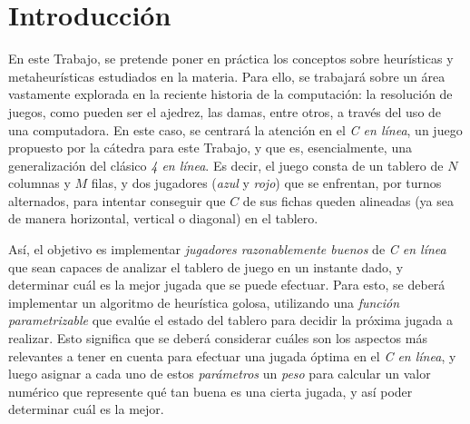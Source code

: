 \documentclass[12pt,a4paper]{article}
\begin{document}





\maketitle

\thispagestyle{empty}
\tableofcontents
\clearpage
\setcounter{page}{1}

\pagestyle{fancy}
\fancyhf{}
\rfoot{\centering \thepage}



\section{Introducción}


En este Trabajo, se pretende poner en práctica los conceptos sobre heurísticas y metaheurísticas estudiados en la materia. Para ello, se trabajará sobre un área vastamente explorada en la reciente historia de la computación: la resolución de juegos, como pueden ser el ajedrez, las damas, entre otros, a través del uso de una computadora. En este caso, se centrará la atención en el \textit{C en línea}, un juego propuesto por la cátedra para este Trabajo, y que es, esencialmente, una generalización del clásico \textit{4 en línea}. Es decir, el juego consta de un tablero de $N$ columnas y $M$ filas, y dos jugadores (\textit{azul} y \textit{rojo}) que se enfrentan, por turnos alternados, para intentar conseguir que $C$ de sus fichas queden alineadas (ya sea de manera horizontal, vertical o diagonal) en el tablero.

Así, el objetivo es implementar \textit{jugadores razonablemente buenos} de \textit{C en línea} que sean capaces de analizar el tablero de juego en un instante dado, y determinar cuál es la mejor jugada que se puede efectuar. Para esto, se deberá implementar un algoritmo de heurística golosa, utilizando una \textit{función parametrizable} que evalúe el estado del tablero para decidir la próxima jugada a realizar. Esto significa que se deberá considerar cuáles son los aspectos más relevantes a tener en cuenta para efectuar una jugada óptima en el \textit{C en línea}, y luego asignar a cada uno de estos \textit{parámetros} un \textit{peso} para calcular un valor numérico que represente qué tan buena es una cierta jugada, y así poder determinar cuál es la mejor.
\end{document}
